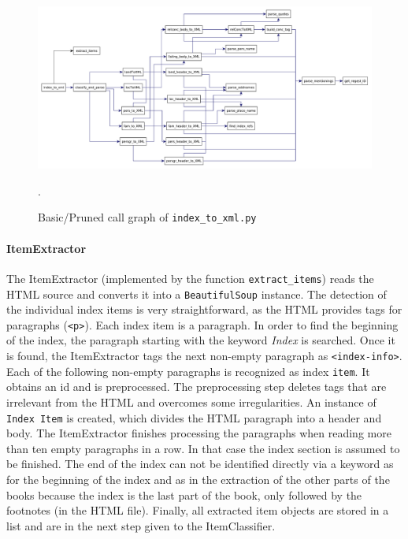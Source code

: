 \begin{figure}[h]
  \centering
  \includegraphics[scale=0.37]{img/index-to-xml}
  \caption{Basic/Pruned call graph of \texttt{index\_to\_xml.py}}.
  \label{fig:index-to-xml}
\end{figure}

\paragraph{ItemExtractor}
The ItemExtractor (implemented by the function \texttt{extract\_items}) reads the HTML source and converts it into a \texttt{BeautifulSoup} instance. The detection of the individual index items is very straightforward, as the HTML provides tags for paragraphs (\texttt{<p>}). Each index item is a paragraph. In order to find the beginning of the index, the paragraph starting with the keyword \textit{Index} is searched. Once it is found, the ItemExtractor tags the next non-empty paragraph as \texttt{<index-info>}. Each of the following non-empty paragraphs is recognized as index \texttt{item}. It obtains an id and is preprocessed. The preprocessing step deletes tags that are irrelevant from the HTML and overcomes some irregularities. An instance of \texttt{Index Item} is created, which divides the HTML paragraph into a header and body. The ItemExtractor finishes processing the paragraphs when reading more than ten empty paragraphs in a row. In that case the index section is assumed to be finished. The end of the index can not be identified directly via a keyword as for the beginning of the index and as in the extraction of the other parts of the books because the index is the last part of the book, only followed by the footnotes (in the HTML file). Finally, all extracted item objects are stored in a list and are in the next step given to the ItemClassifier.

